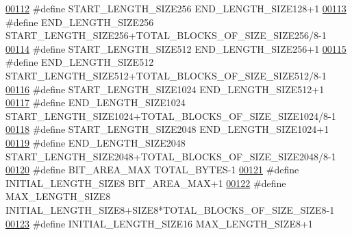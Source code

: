 \begin{DoxyCode}
{\hypertarget{memory_management_8h_source_l00112}{}\hyperlink{memory_management_8h_ae4c0b0fa2b86d8d809b6da282ec30a14}{00112} \textcolor{preprocessor}{#define START\_LENGTH\_SIZE256              END\_LENGTH\_SIZE128+1}
\hypertarget{memory_management_8h_source_l00113}{}\hyperlink{memory_management_8h_aefbb31124611a832256505b7d2a5a7aa}{00113} \textcolor{preprocessor}{#define END\_LENGTH\_SIZE256                START\_LENGTH\_SIZE256+TOTAL\_BLOCKS\_OF\_SIZE\_SIZE256/8-1}
\hypertarget{memory_management_8h_source_l00114}{}\hyperlink{memory_management_8h_a543a9998e3811f5715ed9f7d4d3b8ff6}{00114} \textcolor{preprocessor}{#define START\_LENGTH\_SIZE512              END\_LENGTH\_SIZE256+1}
\hypertarget{memory_management_8h_source_l00115}{}\hyperlink{memory_management_8h_a49d1beaf8d6485612e2feb9502a86c6a}{00115} \textcolor{preprocessor}{#define END\_LENGTH\_SIZE512                START\_LENGTH\_SIZE512+TOTAL\_BLOCKS\_OF\_SIZE\_SIZE512/8-1}
\hypertarget{memory_management_8h_source_l00116}{}\hyperlink{memory_management_8h_af813417d82cdcd72cf5d7e4d7a659d06}{00116} \textcolor{preprocessor}{#define START\_LENGTH\_SIZE1024             END\_LENGTH\_SIZE512+1}
\hypertarget{memory_management_8h_source_l00117}{}\hyperlink{memory_management_8h_a734ff1bf94e71b8c9146b544f4600269}{00117} \textcolor{preprocessor}{#define END\_LENGTH\_SIZE1024               START\_LENGTH\_SIZE1024+TOTAL\_BLOCKS\_OF\_SIZE\_SIZE1024/8-1}
\hypertarget{memory_management_8h_source_l00118}{}\hyperlink{memory_management_8h_a0f7aee3abb937b3fa8312010bf97d73c}{00118} \textcolor{preprocessor}{#define START\_LENGTH\_SIZE2048             END\_LENGTH\_SIZE1024+1}
\hypertarget{memory_management_8h_source_l00119}{}\hyperlink{memory_management_8h_ab27dfaffd34f4f946ed6c1201b0ecde6}{00119} \textcolor{preprocessor}{#define END\_LENGTH\_SIZE2048               START\_LENGTH\_SIZE2048+TOTAL\_BLOCKS\_OF\_SIZE\_SIZE2048/8-1}
\hypertarget{memory_management_8h_source_l00120}{}\hyperlink{memory_management_8h_ae6e8c160e33920d62b1614403be7857d}{00120} \textcolor{preprocessor}{#define BIT\_AREA\_MAX                      TOTAL\_BYTES-1}
\hypertarget{memory_management_8h_source_l00121}{}\hyperlink{memory_management_8h_a6882776ff546dc78d6eb192782c04726}{00121} \textcolor{preprocessor}{#define INITIAL\_LENGTH\_SIZE8              BIT\_AREA\_MAX+1}
\hypertarget{memory_management_8h_source_l00122}{}\hyperlink{memory_management_8h_a5a31221b432ad5a360476010f3d786fe}{00122} \textcolor{preprocessor}{#define MAX\_LENGTH\_SIZE8                  INITIAL\_LENGTH\_SIZE8+SIZE8*TOTAL\_BLOCKS\_OF\_SIZE\_SIZE8-1}
\hypertarget{memory_management_8h_source_l00123}{}\hyperlink{memory_management_8h_aa54fe86781c9274a8b4826ddcf149ce4}{00123} \textcolor{preprocessor}{#define INITIAL\_LENGTH\_SIZE16             MAX\_LENGTH\_SIZE8+1}
}
\end{DoxyCode}

